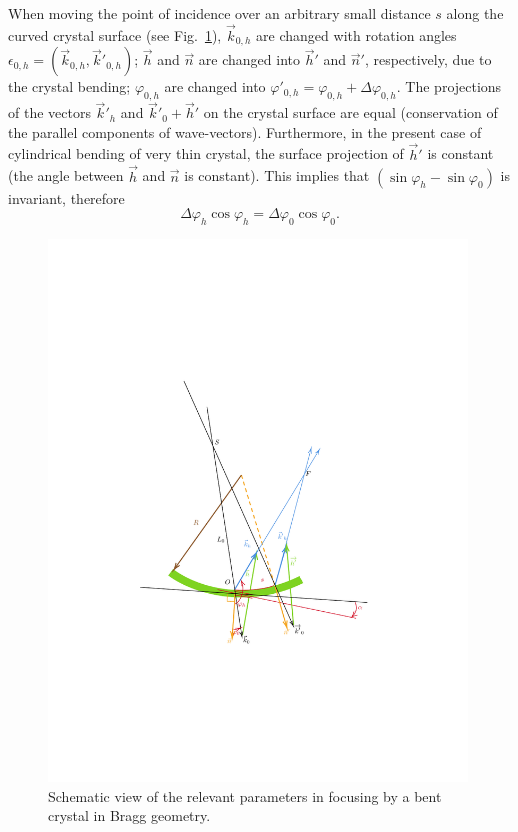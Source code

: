\documentclass[preprint]{iucr}              %
\begin{document}
When moving the point of incidence over an arbitrary small distance $s$ along the curved crystal surface (see Fig.~\ref{fig:vectors}), 
$\vec k_{0,h}$ are changed
with rotation angles $\epsilon_{0,h} = (\vec k_{0,h},\vec k'_{0,h})$; $\vec h$ and $\vec n$ are changed into $\vec h'$ and $\vec n'$, respectively, due to the crystal bending;
$\varphi_{0,h}$ are changed into $\varphi'_{0,h}=\varphi_{0,h}+\Delta \varphi_{0,h}$.
The projections of the vectors $\vec k'_{h}$ and $\vec k'_{0}+\vec h'$ on the crystal surface are equal (conservation of the parallel components of wave-vectors).
Furthermore, in the present case of cylindrical bending of very thin crystal, the surface projection of $\vec h'$ is constant (the angle between $\vec h$ and $\vec n$ is constant).
This implies that $(\sin \varphi_h - \sin \varphi_0)$ is invariant, therefore
\begin{equation}
\label{eq:invariant}
    \Delta \varphi_h \cos\varphi_h = \Delta \varphi_0 \cos\varphi_0.
\end{equation}

\begin{figure}
\label{fig:vectors}
\caption{Schematic view of the relevant parameters in focusing by a bent crystal in Bragg geometry.
}
\includegraphics[width=0.99\textwidth,trim=4cm 6cm 5cm 10cm,clip=true]{fig2.pdf}
\end{figure}
\end{document}
